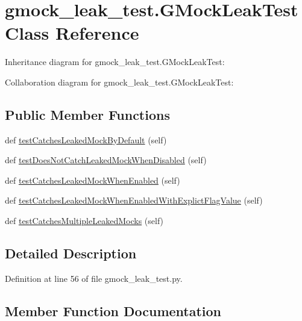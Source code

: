 \hypertarget{classgmock__leak__test_1_1_g_mock_leak_test}{}\section{gmock\+\_\+leak\+\_\+test.\+G\+Mock\+Leak\+Test Class Reference}
\label{classgmock__leak__test_1_1_g_mock_leak_test}


Inheritance diagram for gmock\+\_\+leak\+\_\+test.\+G\+Mock\+Leak\+Test\+:


Collaboration diagram for gmock\+\_\+leak\+\_\+test.\+G\+Mock\+Leak\+Test\+:
\subsection*{Public Member Functions}
\begin{DoxyCompactItemize}
\item 
def \hyperlink{classgmock__leak__test_1_1_g_mock_leak_test_ad87d271de7b3f106e51272d6e9139c76}{test\+Catches\+Leaked\+Mock\+By\+Default} (self)
\item 
def \hyperlink{classgmock__leak__test_1_1_g_mock_leak_test_a3107bf5a603558ab2d97d88fb5589951}{test\+Does\+Not\+Catch\+Leaked\+Mock\+When\+Disabled} (self)
\item 
def \hyperlink{classgmock__leak__test_1_1_g_mock_leak_test_a78f4040a392d183597f71d92da8c1246}{test\+Catches\+Leaked\+Mock\+When\+Enabled} (self)
\item 
def \hyperlink{classgmock__leak__test_1_1_g_mock_leak_test_ab19cf302ea06e1b186bd6ab951d9161e}{test\+Catches\+Leaked\+Mock\+When\+Enabled\+With\+Explict\+Flag\+Value} (self)
\item 
def \hyperlink{classgmock__leak__test_1_1_g_mock_leak_test_a09465b2bfde98834e4bb9563c035f034}{test\+Catches\+Multiple\+Leaked\+Mocks} (self)
\end{DoxyCompactItemize}


\subsection{Detailed Description}


Definition at line 56 of file gmock\+\_\+leak\+\_\+test.\+py.



\subsection{Member Function Documentation}

